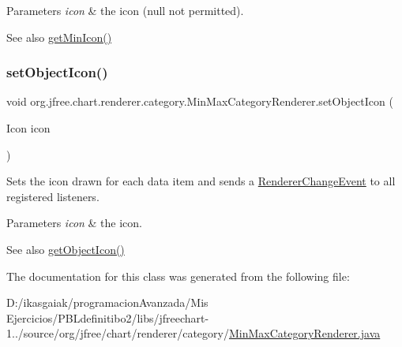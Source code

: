 \begin{DoxyParams}{Parameters}
{\em icon} & the icon ({\ttfamily null} not permitted).\\
\hline
\end{DoxyParams}
\begin{DoxySeeAlso}{See also}
\mbox{\hyperlink{classorg_1_1jfree_1_1chart_1_1renderer_1_1category_1_1_min_max_category_renderer_a2a9fc133d63761d1ced80ea2d45de730}{get\+Min\+Icon()}} 
\end{DoxySeeAlso}
\mbox{\label{classorg_1_1jfree_1_1chart_1_1renderer_1_1category_1_1_min_max_category_renderer_af86364bce323a2f335493c088181325d}} 
\subsubsection{\texorpdfstring{set\+Object\+Icon()}{setObjectIcon()}}
{\footnotesize\ttfamily void org.\+jfree.\+chart.\+renderer.\+category.\+Min\+Max\+Category\+Renderer.\+set\+Object\+Icon (\begin{DoxyParamCaption}\item[{Icon}]{icon }\end{DoxyParamCaption})}

Sets the icon drawn for each data item and sends a \mbox{\hyperlink{}{Renderer\+Change\+Event}} to all registered listeners.


\begin{DoxyParams}{Parameters}
{\em icon} & the icon.\\
\hline
\end{DoxyParams}
\begin{DoxySeeAlso}{See also}
\mbox{\hyperlink{classorg_1_1jfree_1_1chart_1_1renderer_1_1category_1_1_min_max_category_renderer_a0f7cfaff627bb78993c0f99d312cdd22}{get\+Object\+Icon()}} 
\end{DoxySeeAlso}


The documentation for this class was generated from the following file\+:\begin{DoxyCompactItemize}
\item 
D\+:/ikasgaiak/programacion\+Avanzada/\+Mis Ejercicios/\+P\+B\+Ldefinitibo2/libs/jfreechart-\/1../source/org/jfree/chart/renderer/category/\mbox{\hyperlink{_min_max_category_renderer_8java}{Min\+Max\+Category\+Renderer.\+java}}\end{DoxyCompactItemize}
